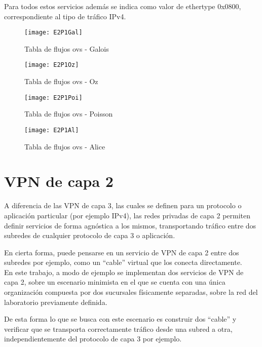Para todos estos servicios adem\'as se indica como valor de ethertype 0x0800, correspondiente al tipo de tr\'afico IPv4.

\newpage
\begin{figure}[ht!] 
\centering    
\texttt{[image: E2P1Gal]}
\caption[Tabla de flujos ovs - Galois]{Tabla de flujos ovs - Galois}
\label{fig:CU1P1DumpFlows1}
\end{figure}

\begin{figure}[h!] 
\centering    
\texttt{[image: E2P1Oz]}
\caption[Tabla de flujos ovs - Oz]{Tabla de flujos ovs - Oz}
\label{fig:CU1P1DumpFlows2}
\end{figure}

\begin{figure}[h!] 
\centering    
\texttt{[image: E2P1Poi]}
\caption[Tabla de flujos ovs - Poisson]{Tabla de flujos ovs - Poisson}
\label{fig:CU1P1DumpFlows3}
\end{figure}

\begin{figure}[h!] 
\centering    
\texttt{[image: E2P1Al]}
\caption[Tabla de flujos ovs - Alice]{Tabla de flujos ovs - Alice}
\label{fig:CU1P1DumpFlows4}
\end{figure}

\newpage
\section{VPN de capa 2}

A diferencia de las VPN de capa 3, las cuales se definen para un protocolo o aplicaci\'on particular (por ejemplo IPv4), las redes privadas de capa 2 permiten definir servicios de forma agnóstica a los mismos, transportando tr\'afico entre dos subredes de cualquier protocolo de capa 3 o aplicación.

En cierta forma, puede pensarse en un servicio de VPN de capa 2 entre dos subredes por ejemplo, como un “cable” virtual que los conecta directamente.\\

En este trabajo, a modo de ejemplo se implementan dos servicios de VPN de capa 2, sobre un escenario minimista en el que se cuenta con una \'unica organización compuesta por dos sucursales físicamente separadas, sobre la red del laboratorio previamente definida.

De esta forma lo que se busca con este escenario es construir dos “cable” y verificar que se transporta correctamente tr\'afico desde una subred a otra, independientemente del protocolo de capa 3 por ejemplo.

